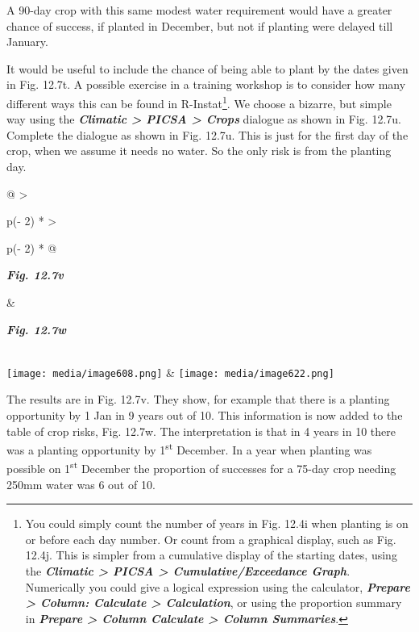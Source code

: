 \documentclass[
  letterpaper,
  DIV=11,
  numbers=noendperiod]{scrreprt}
\begin{document}
A 90-day crop with this same modest water requirement would have a
greater chance of success, if planted in December, but not if planting
were delayed till January.

It would be useful to include the chance of being able to plant by the
dates given in Fig. 12.7t. A possible exercise in a training workshop is
to consider how many different ways this can be found in
R-Instat\footnote{You could simply count the number of years in Fig.
  12.4i when planting is on or before each day number. Or count from a
  graphical display, such as Fig. 12.4j. This is simpler from a
  cumulative display of the starting dates, using the
  \textbf{\emph{Climatic \textgreater{} PICSA \textgreater{}
  Cumulative/Exceedance Graph}}. Numerically you could give a logical
  expression using the calculator, \textbf{\emph{Prepare \textgreater{}
  Column: Calculate \textgreater{} Calculation}}, or using the
  proportion summary in \textbf{\emph{Prepare \textgreater{} Column
  Calculate \textgreater{} Column Summaries}}.}. We choose a bizarre,
but simple way using the \textbf{\emph{Climatic \textgreater{} PICSA
\textgreater{} Crops}} dialogue as shown in Fig. 12.7u. Complete the
dialogue as shown in Fig. 12.7u. This is just for the first day of the
crop, when we assume it needs no water. So the only risk is from the
planting day.

\begin{longtable}[]{@{}
  >{\raggedright\arraybackslash}p{(\columnwidth - 2\tabcolsep) * }
  >{\raggedright\arraybackslash}p{(\columnwidth - 2\tabcolsep) * }@{}}
\toprule\noalign{}
\begin{minipage}[b]{\linewidth}\raggedright
\textbf{\emph{Fig. 12.7v}}
\end{minipage} & \begin{minipage}[b]{\linewidth}\raggedright
\textbf{\emph{Fig. 12.7w}}
\end{minipage} \\
\midrule\noalign{}
\endhead
\bottomrule\noalign{}
\endlastfoot
\texttt{[image: media/image608.png]} &
\texttt{[image: media/image622.png]} \\
\end{longtable}

The results are in Fig. 12.7v. They show, for example that there is a
planting opportunity by 1 Jan in 9 years out of 10. This information is
now added to the table of crop risks, Fig. 12.7w. The interpretation is
that in 4 years in 10 there was a planting opportunity by
1\textsuperscript{st} December. In a year when planting was possible on
1\textsuperscript{st} December the proportion of successes for a 75-day
crop needing 250mm water was 6 out of 10.
\end{document}
